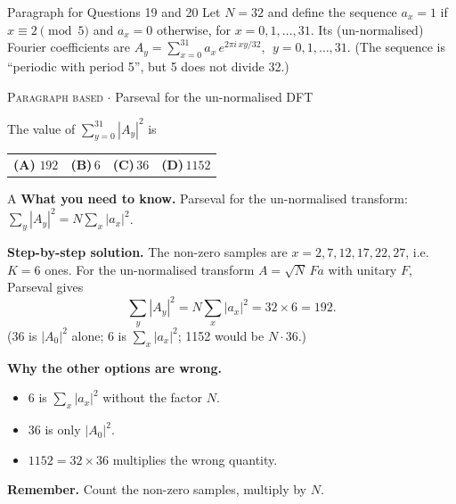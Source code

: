 \documentclass[11pt,a4paper]{article}
\newcommand{\optlabel}[1]{\textbf{(#1)}}
\newcommand{\correctlabel}[1]{\textcolor{okgreen}{\textbf{(#1)}\,\ding{51}}}
\newenvironment{qitem}[1]{\begin{list}{}{\setlength{\leftmargin}{3.3em}\setlength{\labelwidth}{3.1em}%
  \setlength{\labelsep}{0.2em}\setlength{\topsep}{3pt}\setlength{\parsep}{3pt}}\item[\textbf{Q.#1}\hfill]}{\end{list}}
\newcommand{\qsep}{\par\vspace{2pt}{\color{black!15}\hrule}\vspace{4pt}}
\newcommand{\qmeta}[2]{{\footnotesize\color{black!60}\textsc{#1} \;$\cdot$\; #2}\par}
\begin{document}
\begin{passagebox}{Paragraph for Questions 19 and 20}
Let $N = 32$ and define the sequence $a_x = 1$ if $x \equiv 2 \pmod 5$ and $a_x = 0$ otherwise, for
$x = 0, 1, \dots, 31$. Its (un-normalised) Fourier coefficients are
$A_y = \sum_{x=0}^{31} a_x\, e^{2\pi i\,xy/32}$, $\;y = 0, 1, \dots, 31$. (The sequence is ``periodic with period 5'', but
5 does not divide 32.)
\end{passagebox}
\begin{qitem}{19}
\qmeta{Paragraph based}{Parseval for the un-normalised DFT}
The value of $\displaystyle\sum_{y=0}^{31} |A_y|^2$ is
\par\smallskip\noindent\begin{tabularx}{\linewidth}{@{}*{4}{L}@{}}
\correctlabel{A}\,$192$ & \optlabel{B}\,$6$ & \optlabel{C}\,$36$ & \optlabel{D}\,$1152$
\end{tabularx}
\end{qitem}
\begin{solbox}{A}
\textbf{\color{brand}What you need to know.} Parseval for the un-normalised transform: $\sum_y|A_y|^2 = N\sum_x|a_x|^2$.

\textbf{\color{brand}Step-by-step solution.} The non-zero samples are $x = 2, 7, 12, 17, 22, 27$, i.e. $K = 6$ ones. For the un-normalised transform
$A = \sqrt{N}\,F a$ with unitary $F$, Parseval gives
\[ \sum_y |A_y|^2 = N\sum_x |a_x|^2 = 32 \times 6 = 192 . \]
(36 is $|A_0|^2$ alone; 6 is $\sum_x|a_x|^2$; 1152 would be $N \cdot 36$.)

\textbf{\color{brand}Why the other options are wrong.}
\begin{itemize}[leftmargin=2.4em, itemsep=1pt, topsep=2pt]
\item[\textbf{(B)}] $6$ is $\sum_x|a_x|^2$ without the factor $N$.
\item[\textbf{(C)}] $36$ is only $|A_0|^2$.
\item[\textbf{(D)}] $1152 = 32\times36$ multiplies the wrong quantity.
\end{itemize}
\textbf{\color{brand}Remember.} Count the non-zero samples, multiply by $N$.
\end{solbox}
\qsep
\end{document}
